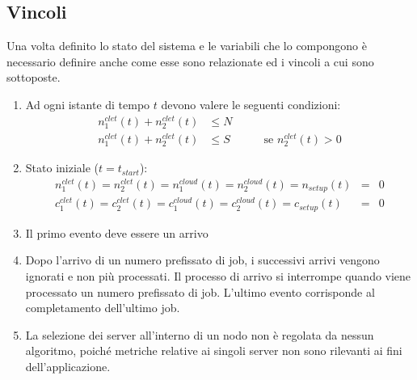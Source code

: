 \subsection{Vincoli}
Una volta definito lo stato del sistema e le variabili che lo compongono è
necessario definire anche come esse sono relazionate ed i vincoli a cui sono
sottoposte.
\begin{enumerate}
\item Ad ogni istante di tempo $t$ devono valere le seguenti condizioni:
\begin{eqnarray*}
n_1^{clet}(t) + n_2^{clet}(t) & \leq N & \\
n_1^{clet}(t) + n_2^{clet}(t) & \leq S & \qquad \textrm{se } n_2^{clet}(t) > 0
\end{eqnarray*}
\item Stato iniziale ($t=t_{start}$):
\begin{eqnarray*}
n_1^{clet}(t) = n_2^{clet}(t) = n_1^{cloud}(t) = n_2^{cloud}(t) = n_{setup}(t) &=& 0 
\\
c_1^{clet}(t) = c_2^{clet}(t) = c_1^{cloud}(t) = c_2^{cloud}(t) = c_{setup}(t) &=& 0
\end{eqnarray*}
\item Il primo evento deve essere un arrivo
\item Dopo l’arrivo di un numero prefissato di job, i successivi arrivi vengono
ignorati e non più processati.  Il processo di arrivo si interrompe quando viene
processato un numero prefissato di job.  L’ultimo evento corrisponde al
completamento dell’ultimo job.
\item La selezione dei server all’interno di un nodo non è regolata da nessun algoritmo, poiché metriche relative ai singoli server non sono rilevanti ai fini dell’applicazione.
\end{enumerate}
%
%
